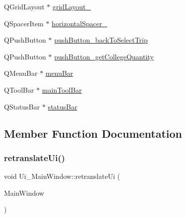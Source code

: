 \begin{DoxyCompactItemize}
\item 
Q\+Grid\+Layout $\ast$ \hyperlink{class_ui___main_window_a82eb42bdbffbbd70131d0f615609aa71}{grid\+Layout\+\_}
\item 
Q\+Spacer\+Item $\ast$ \hyperlink{class_ui___main_window_a90dabda691011afb194823ac0c52d694}{horizontal\+Spacer\+\_}
\item 
Q\+Push\+Button $\ast$ \hyperlink{class_ui___main_window_a7a3c6d477d6e619ccc6ddccb8fd7c121}{push\+Button\+\_\+back\+To\+Select\+Trip}
\item 
Q\+Push\+Button $\ast$ \hyperlink{class_ui___main_window_ade31957bbacd31d020f142120924ba3a}{push\+Button\+\_\+get\+College\+Quantity}
\item 
Q\+Menu\+Bar $\ast$ \hyperlink{class_ui___main_window_a2be1c24ec9adfca18e1dcc951931457f}{menu\+Bar}
\item 
Q\+Tool\+Bar $\ast$ \hyperlink{class_ui___main_window_a5172877001c8c7b4e0f6de50421867d1}{main\+Tool\+Bar}
\item 
Q\+Status\+Bar $\ast$ \hyperlink{class_ui___main_window_a50fa481337604bcc8bf68de18ab16ecd}{status\+Bar}
\end{DoxyCompactItemize}


\subsection{Member Function Documentation}
\mbox{\label{class_ui___main_window_a097dd160c3534a204904cb374412c618}} 
\subsubsection{\texorpdfstring{retranslate\+Ui()}{retranslateUi()}}
{\footnotesize\ttfamily void Ui\+\_\+\+Main\+Window\+::retranslate\+Ui (\begin{DoxyParamCaption}\item[{Q\+Main\+Window $\ast$}]{Main\+Window }\end{DoxyParamCaption})\hspace{0.3cm}{\ttfamily [inline]}}

\mbox{\label{class_ui___main_window_acf4a0872c4c77d8f43a2ec66ed849b58}} 
